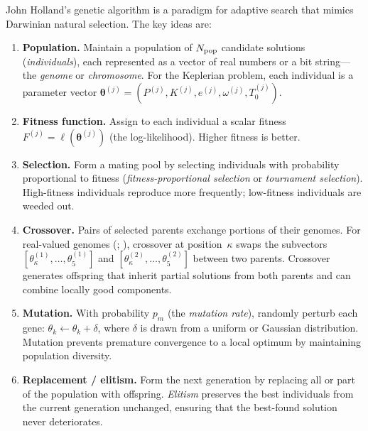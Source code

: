 \documentclass[12pt]{article}
\begin{document}
John Holland's genetic algorithm \citep{Holland1975} is a paradigm for
adaptive search that mimics Darwinian natural selection.  The key ideas
are:
\begin{enumerate}
  \item \textbf{Population.}  Maintain a population of $N_{\rm pop}$
    candidate solutions (\emph{individuals}), each represented as a
    vector of real numbers or a bit string---the \emph{genome} or
    \emph{chromosome}.  For the Keplerian problem, each individual is
    a parameter vector
    $\boldsymbol\theta^{(j)} = (P^{(j)}, K^{(j)}, e^{(j)},
    \omega^{(j)}, T_0^{(j)})$.

  \item \textbf{Fitness function.}  Assign to each individual a scalar
    fitness $F^{(j)} = \ell(\boldsymbol\theta^{(j)})$ (the
    log-likelihood).  Higher fitness is better.

  \item \textbf{Selection.}  Form a mating pool by selecting individuals
    with probability proportional to fitness (\emph{fitness-proportional
    selection} or \emph{tournament selection}).  High-fitness individuals
    reproduce more frequently; low-fitness individuals are weeded out.

  \item \textbf{Crossover.}  Pairs of selected parents exchange portions
    of their genomes.  For real-valued genomes (\citealt{Goldberg1989};
    \citealt{Charbonneau1995}), crossover at position~$\kappa$ swaps
    the subvectors $[\theta_\kappa^{(1)}, \ldots, \theta_5^{(1)}]$ and
    $[\theta_\kappa^{(2)}, \ldots, \theta_5^{(2)}]$ between two parents.
    Crossover generates offspring that inherit partial solutions from
    both parents and can combine locally good components.

  \item \textbf{Mutation.}  With probability $p_m$ (the \emph{mutation
    rate}), randomly perturb each gene: $\theta_k \leftarrow \theta_k +
    \delta$, where $\delta$ is drawn from a uniform or Gaussian
    distribution.  Mutation prevents premature convergence to a local
    optimum by maintaining population diversity.

  \item \textbf{Replacement / elitism.}  Form the next generation by
    replacing all or part of the population with offspring.
    \emph{Elitism} preserves the best individuals from the current
    generation unchanged, ensuring that the best-found solution never
    deteriorates.
\end{enumerate}
\end{document}
